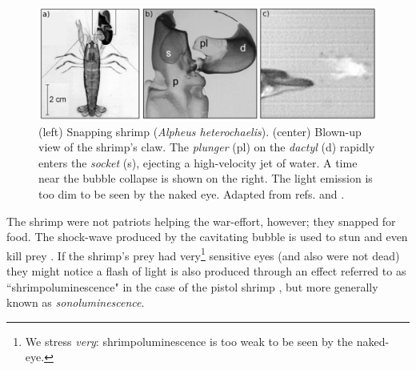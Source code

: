 \documentclass[rmp,aps,nofootinbib,superscriptaddress,floatfix]{revtex4-2}
\begin{document}
\begin{figure}
\includegraphics[width=0.95\linewidth]{figs/shrimp.pdf}
    \caption{(left) Snapping shrimp (\emph{Alpheus heterochaelis}). (center) Blown-up view of the shrimp's claw. The \emph{plunger} (pl) on the \emph{dactyl} (d) rapidly enters the \emph{socket} (s), ejecting a high-velocity jet of water. A time near the bubble collapse is shown on the right. The light emission is too dim to be seen by the naked eye. Adapted from refs. \cite{versluis2000snapping} and \cite{lohse2001snapping}.}
\label{fig:shrimp}
\end{figure}

The shrimp were not patriots helping the war-effort, however; they snapped for food. The shock-wave produced by the cavitating bubble is used to stun and even kill prey \cite{versluis2000snapping}. If the shrimp's prey had very\footnote{We stress \emph{very}: shrimpoluminescence is too weak to be seen by the naked-eye.} sensitive eyes (and also were not dead) they might notice a flash of light is also produced through an effect referred to as ``shrimpoluminescence" in the case of the pistol shrimp \cite{lohse2001snapping}, but more generally known as \emph{sonoluminescence}.
\end{document}
